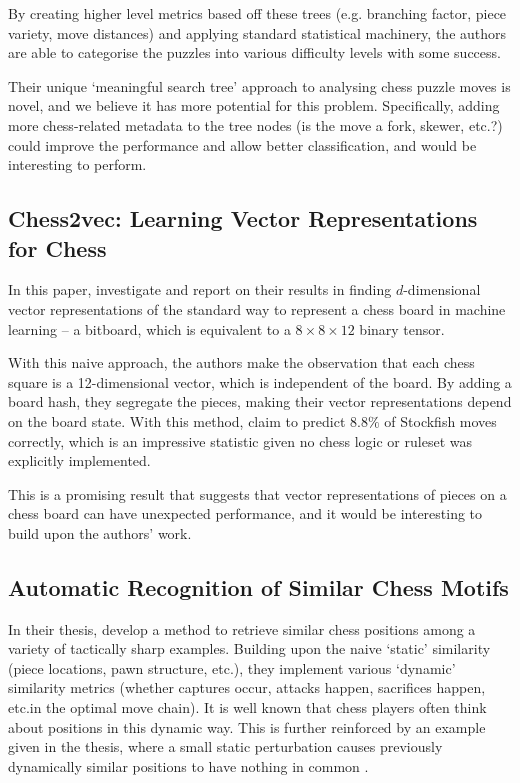 By creating higher level metrics based off these trees (e.g. branching factor,
piece variety, move distances) and applying standard statistical machinery, the
authors are able to categorise the puzzles into various difficulty levels with
some success.

Their unique `meaningful search tree' \citep{chessTrees} approach to analysing
chess puzzle moves is novel, and we believe it has more potential for this
problem. Specifically, adding more chess-related metadata to the tree nodes (is
the move a fork, skewer, etc.?\@) could improve the performance and allow
better classification, and would be interesting to perform.

\subsection{Chess2vec: Learning Vector Representations for Chess}

In this paper, \citet{chess2vec} investigate and report on their results in
finding $d$-dimensional vector representations of the standard way to represent
a chess board in machine learning -- a bitboard, which is equivalent to a
$8\times8\times12$ binary tensor. 

With this naive approach, the authors make the observation that each chess
square is a 12-dimensional vector, which is independent of the board. By adding
a board hash, they segregate the pieces, making their vector representations
depend on the board state. With this method, \cite{chess2vec} claim to predict
$8.8\%$ of Stockfish moves correctly, which is an impressive statistic given no
chess logic or ruleset was explicitly implemented.

This is a promising result that suggests that vector representations of pieces
on a chess board can have unexpected performance, and it would be interesting
to build upon the authors' work.

\subsection{Automatic Recognition of Similar Chess Motifs}
\label{chessMotifsOverview}

In their thesis, \citet{chessMotifs} develop a method to retrieve similar chess
positions among a variety of tactically sharp examples. Building upon the naive
`static' similarity (piece locations, pawn structure, etc.\@), they implement
various `dynamic' similarity metrics (whether captures occur, attacks happen,
sacrifices happen, etc.\@ in the optimal move chain). It is well known
\citep{thoughtAndChoice, bilalic2010mechanisms} that chess players often think
about positions in this dynamic way. This is further reinforced by an example
given in the thesis, where a small static perturbation causes previously
dynamically similar positions to have nothing in common \citep{chessMotifs}.

